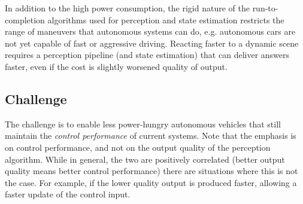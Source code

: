 In addition to the high power consumption, the rigid nature of the run-to-completion algorithms used for perception and state estimation restricts the range of maneuvers that autonomous systems can do, e.g. autonomous cars are not yet capable of fast or aggressive driving.
Reacting faster to a dynamic scene requires a perception pipeline (and state estimation) that can deliver answers faster, even if the cost is slightly worsened quality of output.

\subsection{Challenge}
The challenge is to enable less power-hungry autonomous vehicles that still maintain the \emph{control performance} of current systems.
Note that the emphasis is on control performance, and not on the output quality of the perception algorithm.
While in general, the two are positively correlated (better output quality means better control performance) there are situations where this is not the case.
For example, if the lower quality output is produced faster, allowing a faster update of the control input.

